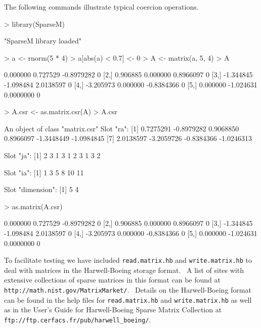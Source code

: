 \documentclass{article}
\begin{document}
The following commands illustrate typical coercion operations.

\begin{Schunk}
\begin{Sinput}
> library(SparseM)
\end{Sinput}
\begin{Soutput}
[1] "SparseM library loaded"
\end{Soutput}
\begin{Sinput}
> a <- rnorm(5 * 4)
> a[abs(a) < 0.7] <- 0
> A <- matrix(a, 5, 4)
> A
\end{Sinput}
\begin{Soutput}
          [,1]      [,2]       [,3] [,4]
[1,]  0.000000  0.727529 -0.8979282    0
[2,]  0.906885  0.000000  0.8966097    0
[3,] -1.344845 -1.098484  2.0138597    0
[4,] -3.205973  0.000000 -0.8384366    0
[5,]  0.000000 -1.024631  0.0000000    0
\end{Soutput}
\begin{Sinput}
> A.csr <- as.matrix.csr(A)
> A.csr
\end{Sinput}
\begin{Soutput}
An object of class "matrix.csr"
Slot "ra":
 [1]  0.7275291 -0.8979282  0.9068850  0.8966097 -1.3448449 -1.0984845
 [7]  2.0138597 -3.2059726 -0.8384366 -1.0246313

Slot "ja":
 [1] 2 3 1 3 1 2 3 1 3 2

Slot "ia":
[1]  1  3  5  8 10 11

Slot "dimension":
[1] 5 4
\end{Soutput}
\begin{Sinput}
> as.matrix(A.csr)
\end{Sinput}
\begin{Soutput}
          [,1]      [,2]       [,3] [,4]
[1,]  0.000000  0.727529 -0.8979282    0
[2,]  0.906885  0.000000  0.8966097    0
[3,] -1.344845 -1.098484  2.0138597    0
[4,] -3.205973  0.000000 -0.8384366    0
[5,]  0.000000 -1.024631  0.0000000    0
\end{Soutput}
\end{Schunk}
To facilitate testing we have included \texttt{read.matrix.hb} 
and \texttt{write.matrix.hb} to deal with matrices
in the Harwell-Boeing storage format.  \ A list of sites with
extensive collections of sparse matrices  in this format can be found at
\texttt{http://math.nist.gov/MatrixMarket/}. \ Details on the Harwell-Boeing format can
be found in the help files for \texttt{read.matrix.hb} and \texttt{write.matrix.hb} as well
as in the User's Guide for Harwell-Boeing Sparse Matrix Collection at
\texttt{ftp://ftp.cerfacs.fr/pub/harwell\_boeing/}.
\end{document}
